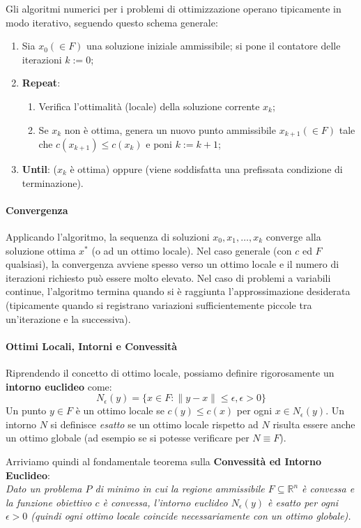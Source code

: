 \documentclass[12pt]{extarticle} %
\begin{document}
Gli algoritmi numerici per i problemi di ottimizzazione operano tipicamente in modo iterativo, seguendo questo schema generale:
\begin{enumerate}
    \item Sia $x_0 (\in F)$ una soluzione iniziale ammissibile; si pone il contatore delle iterazioni $k := 0$;
    \item \textbf{Repeat}:
    \begin{enumerate}
        \item[2.1] Verifica l'ottimalità (locale) della soluzione corrente $x_k$;
        \item[2.2] Se $x_k$ non è ottima, genera un nuovo punto ammissibile $x_{k+1} (\in F)$ tale che $c(x_{k+1}) \le c(x_k)$ e poni $k := k+1$;
    \end{enumerate}
    \item \textbf{Until}: ($x_k$ è ottima) oppure (viene soddisfatta una prefissata condizione di terminazione).
\end{enumerate}

\paragraph{Convergenza}
Applicando l'algoritmo, la sequenza di soluzioni $x_0, x_1, \dots, x_k$ converge alla soluzione ottima $x^*$ (o ad un ottimo locale). 
Nel caso generale (con $c$ ed $F$ qualsiasi), la convergenza avviene spesso verso un ottimo locale e il numero di iterazioni richiesto può essere molto elevato. 
Nel caso di problemi a variabili continue, l'algoritmo termina quando si è raggiunta l'approssimazione desiderata (tipicamente quando si registrano variazioni sufficientemente piccole tra un'iterazione e la successiva).

\paragraph{Ottimi Locali, Intorni e Convessità}
Riprendendo il concetto di ottimo locale, possiamo definire rigorosamente un \textbf{intorno euclideo} come:
$$N_\epsilon(y) = \{x \in F : \|y - x\| \le \epsilon, \epsilon > 0\}$$
Un punto $y \in F$ è un ottimo locale se $c(y) \le c(x)$ per ogni $x \in N_\epsilon(y)$. 
Un intorno $N$ si definisce \textit{esatto} se un ottimo locale rispetto ad $N$ risulta essere anche un ottimo globale (ad esempio se si potesse verificare per $N \equiv F$).

Arriviamo quindi al fondamentale teorema sulla \textbf{Convessità ed Intorno Euclideo}:\\
\textit{Dato un problema $P$ di minimo in cui la regione ammissibile $F \subseteq \mathbb{R}^n$ è convessa e la funzione obiettivo $c$ è convessa, l'intorno euclideo $N_\epsilon(y)$ è esatto per ogni $\epsilon > 0$ (quindi ogni ottimo locale coincide necessariamente con un ottimo globale).}
\end{document}
